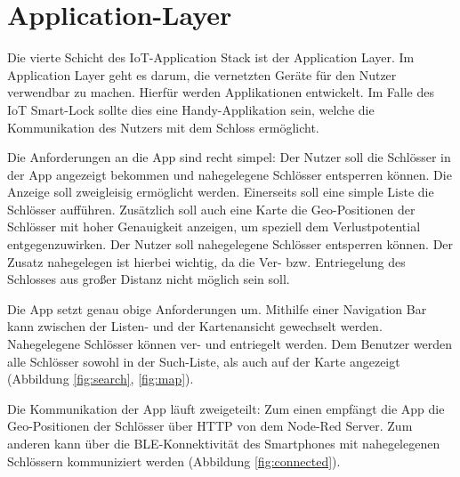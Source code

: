 
\section{Application-Layer}
Die vierte Schicht des \ac{IoT}-Application Stack ist der Application Layer. Im Application Layer geht es darum, die vernetzten Geräte für den Nutzer verwendbar zu machen. Hierfür werden Applikationen entwickelt. Im Falle des \ac{IoT} Smart-Lock sollte dies eine Handy-Applikation sein, welche die Kommunikation des Nutzers mit dem Schloss ermöglicht.

Die Anforderungen an die App sind recht simpel: Der Nutzer soll die Schlösser in der App angezeigt bekommen und nahegelegene Schlösser entsperren können. Die Anzeige soll zweigleisig ermöglicht werden. Einerseits soll eine simple Liste die Schlösser aufführen. Zusätzlich soll auch eine Karte die Geo-Positionen der Schlösser mit hoher Genauigkeit anzeigen, um speziell dem Verlustpotential entgegenzuwirken. Der Nutzer soll nahegelegene Schlösser entsperren können. Der Zusatz nahegelegen ist hierbei wichtig, da die Ver- bzw. Entriegelung des Schlosses aus großer Distanz nicht möglich sein soll.

Die App setzt genau obige Anforderungen um. Mithilfe einer Navigation Bar kann zwischen der Listen- und der Kartenansicht gewechselt werden. Nahegelegene Schlösser können ver- und entriegelt werden. Dem Benutzer werden alle Schlösser sowohl in der Such-Liste, als auch auf der Karte angezeigt (Abbildung \ref{fig:search}, \ref{fig:map}).

Die Kommunikation der App läuft zweigeteilt: Zum einen empfängt die App die Geo-Positionen der Schlösser über \ac{HTTP} von dem Node-Red Server. Zum anderen kann über die \ac{BLE}-Konnektivität des Smartphones mit nahegelegenen Schlössern kommuniziert werden (Abbildung \ref{fig:connected}).

